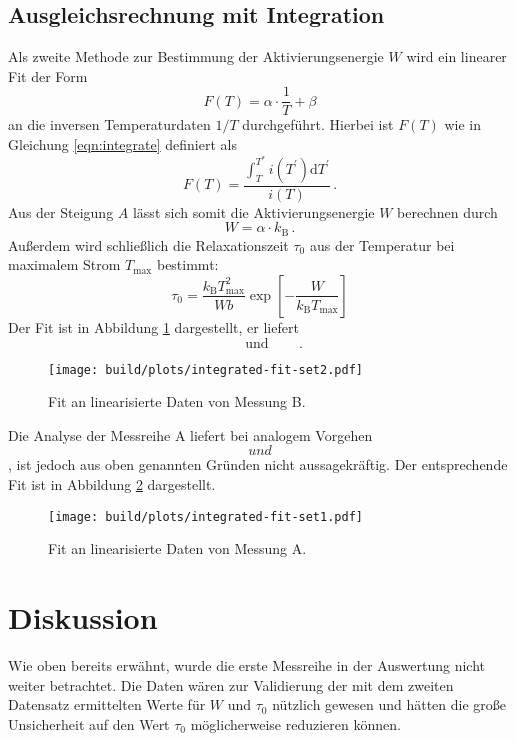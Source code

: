 \subsection{Ausgleichsrechnung mit Integration}
\label{subsec:integration}
Als zweite Methode zur Bestimmung der Aktivierungsenergie $W$ wird ein
linearer Fit der Form
\begin{equation*}
    F(T) = \alpha\cdot\frac{1}{T} + \beta
\end{equation*}
an die inversen Temperaturdaten $1/T$ durchgeführt.
Hierbei ist $F(T)$ wie in Gleichung \ref{eqn:integrate} definiert als
\begin{equation*}
    F(T) = \frac{\int_T^{T^\ast} i(T^\prime)\mathrm{d}T^\prime}{i(T)}\,.
\end{equation*}
Aus der Steigung $A$ lässt sich somit die Aktivierungsenergie $W$
berechnen durch
\begin{equation*}
    W = \alpha\cdot k_\text{B}\,.
\end{equation*}
Außerdem wird schließlich die Relaxationszeit $\tau_0$ aus der Temperatur
bei maximalem Strom $T_\text{max}$ bestimmt:
\begin{equation*}
    \tau_0 = \frac{k_\text{B}T_\text{max}^2}{Wb}
             \exp\!\left[-\frac{W}{k_\text{B}T_\text{max}} \right]
\end{equation*}
Der Fit ist in Abbildung \ref{fig:integrate_fit2} dargestellt, er liefert
\begin{equation*}
     \qquad\text{und}\qquad \,.
\end{equation*}
\begin{figure}
    \centering
    \texttt{[image: build/plots/integrated-fit-set2.pdf]}
    \caption{Fit an linearisierte Daten von Messung B.}
    \label{fig:integrate_fit2}
\end{figure}
Die Analyse der Messreihe A liefert bei analogem Vorgehen
$$ und
$$, ist jedoch aus oben genannten
Gründen nicht aussagekräftig. Der entsprechende Fit ist in Abbildung
\ref{fig:integrate_fit1} dargestellt.
\begin{figure}
    \centering
    \texttt{[image: build/plots/integrated-fit-set1.pdf]}
    \caption{Fit an linearisierte Daten von Messung A.}
    \label{fig:integrate_fit1}
\end{figure}

\newpage
\section{Diskussion}
\label{sec:diskussion}
Wie oben bereits erwähnt, wurde die erste Messreihe in der Auswertung nicht
weiter betrachtet.
Die Daten wären zur Validierung der mit dem zweiten Datensatz ermittelten Werte
für $W$ und $\tau_0$ nützlich gewesen und hätten die große Unsicherheit
auf den Wert $\tau_0$ möglicherweise reduzieren können.


